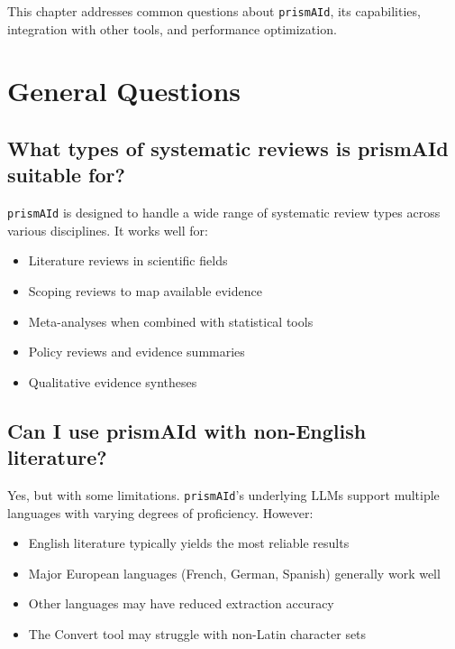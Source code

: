 This chapter addresses common questions about \texttt{prismAId}, its capabilities, integration with other tools, and performance optimization.

\section{General Questions}

\subsection{What types of systematic reviews is prismAId suitable for?}

\texttt{prismAId} is designed to handle a wide range of systematic review types across various disciplines. It works well for:

\begin{itemize}
    \item Literature reviews in scientific fields
    \item Scoping reviews to map available evidence
    \item Meta-analyses when combined with statistical tools
    \item Policy reviews and evidence summaries
    \item Qualitative evidence syntheses
\end{itemize}

\subsection{Can I use prismAId with non-English literature?}

Yes, but with some limitations. \texttt{prismAId}'s underlying LLMs support multiple languages with varying degrees of proficiency. However:

\begin{itemize}
    \item English literature typically yields the most reliable results
    \item Major European languages (French, German, Spanish) generally work well
    \item Other languages may have reduced extraction accuracy
    \item The Convert tool may struggle with non-Latin character sets
\end{itemize}

